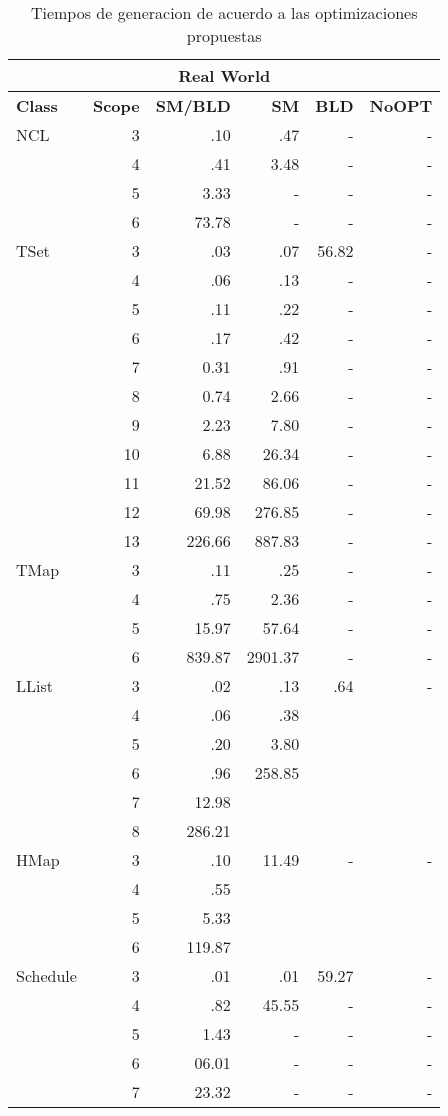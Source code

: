 
\begin{table}[H]
\scriptsize

\centering
\begin{tabular}{ l r | r | r | r | r  }
  \toprule
  \multicolumn{6}{c}{\textbf{Real World}} \\
  \midrule 
  \textbf{Class} & \textbf{Scope} & \textbf{SM/BLD} & \textbf{SM}  & \textbf{BLD} & \textbf{NoOPT}  \\
  \midrule
  NCL
&	3	&	.10	&	.47	&	-	&	-	\\
&	4	&	.41	&	3.48	&	-	&	-	\\
&	5	&	3.33	&	-	&	-	&	-	\\
&	6	&	73.78	&	-	&	-	&	-	\\
  \midrule
  TSet
&	3	&	.03	&	.07	&	56.82	&	-	\\
&	4	&	.06	&	.13	&	-	&	-	\\
&	5	&	.11	&	.22	&	-	&	-	\\
&	6	&	.17	&	.42	&	-	&	-	\\
&	7	&	0.31	&	.91	&	-	&	-	\\
&	8	&	0.74	&	2.66	&	-	&	-	\\
&	9	&	2.23	&	7.80	&	-	&	-	\\
&	10	&	6.88	&	26.34	&	-	&	-	\\
&	11	&	21.52	&	86.06	&	-	&	-	\\
&	12	&	69.98	&	276.85	&	-	&	-	\\
&	13	&	226.66	&	887.83	&	-	&	-	\\
    \midrule
  TMap
&	3	&	.11	&	.25	&	-	&	-	\\
&	4	&	.75	&	2.36	&	-	&	-	\\
&	5	&	15.97	&	57.64	&	-	&	-	\\
&	6	&	839.87	&	2901.37	&	-	&	-	\\
  \midrule
  LList
&	3	&	.02	&	.13	&	.64	&	-	\\
&	4	&	.06	&	.38	&		&		\\
&	5	&	.20	&	3.80	&		&		\\
&	6	&	.96	&	258.85	&		&		\\
&	7	&	12.98	&		&		&		\\
&	8	&	286.21	&		&		&		\\
  \midrule
  HMap
&	3	&	.10	&	11.49	&	-	&	-	\\
&	4	&	.55	&		&		&		\\
&	5	&	5.33	&		&		&		\\
&	6	&	119.87	&		&		&		\\
  \midrule
  Schedule
&	3	&	.01	&	.01	&	59.27	&	-	\\
&	4	&	.82	&	45.55	&	-	&	-	\\
&	5	&	1.43	&	-	&	-	&	-	\\
&	6	&	06.01	&	-	&	-	&	-	\\
&	7	&	23.32	&	-	&	-	&	-	\\
  \bottomrule

\end{tabular}
\caption{Tiempos de generacion de acuerdo a las optimizaciones propuestas}
\label{tab:results-realWorld}

\end{table}



